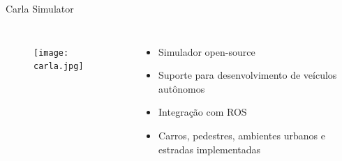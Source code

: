 \begin{frame}[t]{Carla Simulator} 
        \begin{columns}[t]
                \begin{figure}
                    \texttt{[image: carla.jpg]}
                \end{figure}
                \vspace*{0.4cm}
                \Large{
                \begin{itemize}
                    \item Simulador open-source
                    \item Suporte para desenvolvimento de veículos autônomos
                    \item Integração com ROS
                    \item Carros, pedestres, ambientes urbanos e estradas implementadas
                \end{itemize}
                }
        \end{columns}
\end{frame}
